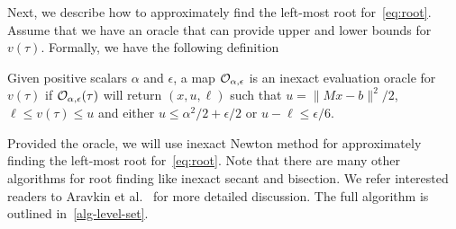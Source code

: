 Next, we describe how to approximately find the left-most root for~\eqref{eq:root}. Assume that we have an oracle that can provide upper and lower bounds for $v(\tau)$. Formally, we have the following definition
\begin{definition}
  Given positive scalars $\alpha$ and $\epsilon$, a map $\mathcal{O}_{\alpha,\epsilon}$ is an inexact evaluation oracle for $v(\tau)$ if $\mathcal{O}_{\alpha,\epsilon}(\tau)$ will return $(x, u, \ell)$ such that $u = \|Mx - b\|^2/2$, $\ell \leq v(\tau) \leq u$ and either $u \leq \alpha^2/2 + \epsilon/2$ or $u - \ell \leq \epsilon/6$.
\end{definition}
Provided the oracle, we will use inexact Newton method for approximately finding the left-most root for~\eqref{eq:root}. Note that there are many other algorithms for root finding like inexact secant and bisection. We refer interested readers to Aravkin et al.~\cite{aravkin2016levelset} for more detailed discussion. The full algorithm is outlined in~\autoref{alg-level-set}.
               
               
                           
                            










